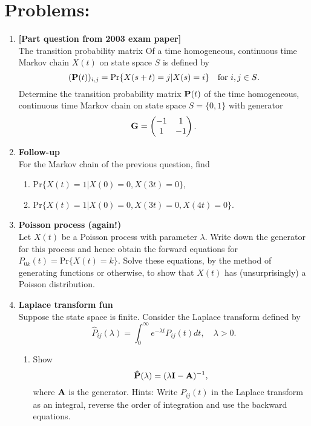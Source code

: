 \documentclass[11pt,a4paper]{article}
\begin{document}
  \section*{Problems:}
  \begin{enumerate}
    \item \textbf{[Part question from 2003 exam paper]}\\
    The transition probability matrix Of a time homogeneous, continuous time Markov chain $X(t)$ on state space $S$ is defined by
    $$
    (\vb{P}(t))_{i,j} = \text{Pr}\{X(s + t) = j|X(s) = i\}\quad \text{for $i,j\in S$}.
    $$
    Determine the transition probability matrix $\vb{P}(t)$ of the time homogeneous, continuous time Markov chain on state space $S = \{0, 1\}$ with generator
    $$
    \vb{G} =
    \begin{pmatrix}
      -1 & 1\\
      1 & -1
    \end{pmatrix}.
    $$
    \item \textbf{Follow-up}\\
    For the Markov chain of the previous question, find
    \begin{enumerate}
      \item $\text{Pr}\{X(t) = 1|X(0) = 0, X(3t) = 0\}$,
      \item $\text{Pr}\{X(t) = 1|X(0) = 0, X(3t) = 0, X(4t) = 0\}$.
    \end{enumerate}
    \item \textbf{Poisson process (again!)}\\
    Let $X(t)$ be a Poisson process with parameter $\lambda$. Write down the generator for this process and hence obtain the forward equations for $P_{0k}(t) = \text{Pr}\{X(t) = k\}$. Solve these equations, by the method of generating functions or otherwise, to show that $X(t)$ has (unsurprisingly) a Poisson distribution.
    \item \textbf{Laplace transform fun}\\
    Suppose the state space is finite. Consider the Laplace transform defined by
    $$
    \hat{P}_{ij}(\lambda) = \int_0^\infty e^{-\lambda t} P_{ij}(t)dt,\quad \lambda > 0.
    $$
    \begin{enumerate}
      \item Show
      $$
      \vb{\hat{P}}(\lambda) = (\lambda\vb{I} - \vb{A})^{-1},
      $$
      where $\vb{A}$ is the generator. Hints: Write $P_{ij}(t)$ in the Laplace transform as an integral, reverse the order of integration and use the backward equations.

\end{enumerate}
\end{enumerate}
\end{document}
